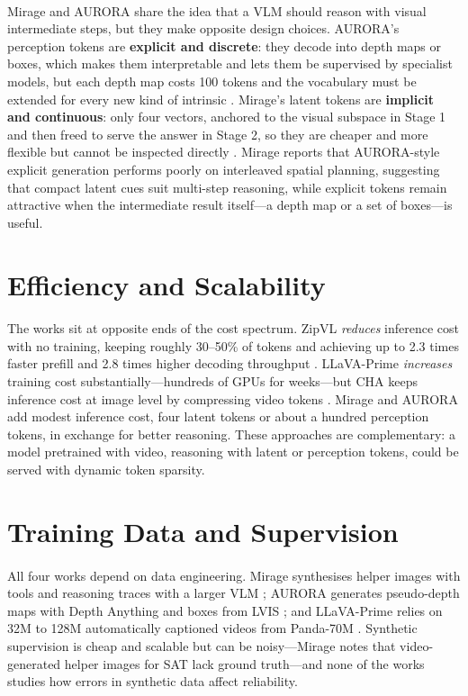 \documentclass[12pt,a4paper,final]{extreport}
\begin{document}
\paragraph{} Mirage and AURORA share the idea that a VLM should reason with visual intermediate steps, but they make opposite design choices. AURORA's perception tokens are \textbf{explicit and discrete}: they decode into depth maps or boxes, which makes them interpretable and lets them be supervised by specialist models, but each depth map costs 100 tokens and the vocabulary must be extended for every new kind of intrinsic \cite{p2}. Mirage's latent tokens are \textbf{implicit and continuous}: only four vectors, anchored to the visual subspace in Stage 1 and then freed to serve the answer in Stage 2, so they are cheaper and more flexible but cannot be inspected directly \cite{p1}. Mirage reports that AURORA-style explicit generation performs poorly on interleaved spatial planning, suggesting that compact latent cues suit multi-step reasoning, while explicit tokens remain attractive when the intermediate result itself---a depth map or a set of boxes---is useful.

\section{Efficiency and Scalability}

\paragraph{} The works sit at opposite ends of the cost spectrum. ZipVL \emph{reduces} inference cost with no training, keeping roughly 30--50\% of tokens and achieving up to 2.3 times faster prefill and 2.8 times higher decoding throughput \cite{p3}. LLaVA-Prime \emph{increases} training cost substantially---hundreds of GPUs for weeks---but CHA keeps inference cost at image level by compressing video tokens \cite{p4}. Mirage and AURORA add modest inference cost, four latent tokens or about a hundred perception tokens, in exchange for better reasoning. These approaches are complementary: a model pretrained with video, reasoning with latent or perception tokens, could be served with dynamic token sparsity.

\section{Training Data and Supervision}

\paragraph{} All four works depend on data engineering. Mirage synthesises helper images with tools and reasoning traces with a larger VLM \cite{p1}; AURORA generates pseudo-depth maps with Depth Anything and boxes from LVIS \cite{p2}; and LLaVA-Prime relies on 32M to 128M automatically captioned videos from Panda-70M \cite{p4}. Synthetic supervision is cheap and scalable but can be noisy---Mirage notes that video-generated helper images for SAT lack ground truth---and none of the works studies how errors in synthetic data affect reliability.
\end{document}
